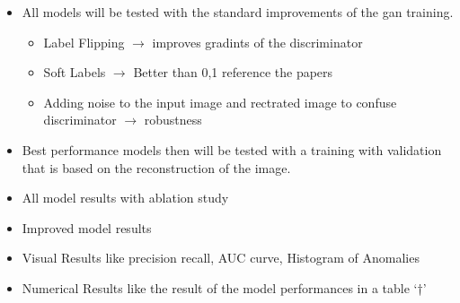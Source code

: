 \begin{itemize}
    \item All models will be tested with the standard improvements of the gan training. \begin{itemize}
        \item Label Flipping $\rightarrow$ improves gradints of the discriminator
        \item Soft Labels $\rightarrow$ Better than 0,1 reference the papers
        \item Adding noise to the input image and rectrated image to confuse discriminator
        $\rightarrow$ robustness
    \end{itemize}
    \item Best performance models then will be tested with a training with validation that is based
    on the reconstruction of the image. 
    \item All model results with ablation study
    \item Improved model results
    \item Visual Results like precision recall, AUC curve, Histogram of Anomalies
    \item Numerical Results like the result of the model performances in a table `†'
\end{itemize}

\endgroup